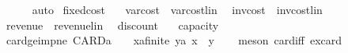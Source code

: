 \begin{isabellebody}
\ \ \ \ \isamarkupfalse%
\ auto\isanewline
{}\isamarkupfalse%
%
\endisatagproof
{\isafoldproof}%
%
\isadelimproof
\isanewline
%
\endisadelimproof
\isanewline
{}\isamarkupfalse%
\ {\isachardoublequoteopen}fixed{\isacharunderscore}{\kern0pt}cost\ {\isasymequiv}\ {}{\isachardoublequoteclose}\isanewline
{}\isamarkupfalse%
\ {\isachardoublequoteopen}var{\isacharunderscore}{\kern0pt}cost\ {\isasymequiv}\ var{\isacharunderscore}{\kern0pt}cost{\isacharunderscore}{\kern0pt}lin\ {}{\isachardoublequoteclose}\isanewline
{}\isamarkupfalse%
\ {\isachardoublequoteopen}inv{\isacharunderscore}{\kern0pt}cost\ {\isasymequiv}\ inv{\isacharunderscore}{\kern0pt}cost{\isacharunderscore}{\kern0pt}lin\ {}{\isachardoublequoteclose}\isanewline
{}\isamarkupfalse%
\ {\isachardoublequoteopen}revenue\ {\isasymequiv}\ revenue{\isacharunderscore}{\kern0pt}lin\ {}{\isachardoublequoteclose}\isanewline
{}\isamarkupfalse%
\ {\isachardoublequoteopen}discount\ {\isasymequiv}\ {}{\isachardot}{\kern0pt}{}{}{\isachardoublequoteclose}\isanewline
{}\isamarkupfalse%
\ capacity\ {\isacharequal}{\kern0pt}\ {\isachardoublequoteopen}{}{}{\isachardoublequoteclose}\isanewline
\isanewline
{}\isamarkupfalse%
\ card{\isacharunderscore}{\kern0pt}ge{\isacharunderscore}{\kern0pt}{}{\isacharunderscore}{\kern0pt}imp{\isacharunderscore}{\kern0pt}ne{\isacharcolon}{\kern0pt}\ {\isachardoublequoteopen}CARD{\isacharparenleft}{\kern0pt}{\isacharprime}{\kern0pt}a{\isacharparenright}{\kern0pt}\ {\isasymge}\ {}\ {\isasymLongrightarrow}\ {\isasymexists}{\isacharparenleft}{\kern0pt}x{\isacharcolon}{\kern0pt}{\isacharcolon}{\kern0pt}{\isacharprime}{\kern0pt}a{\isacharcolon}{\kern0pt}{\isacharcolon}{\kern0pt}finite{\isacharparenright}{\kern0pt}\ y{\isacharcolon}{\kern0pt}{\isacharcolon}{\kern0pt}{\isacharprime}{\kern0pt}a{\isachardot}{\kern0pt}\ x\ {\isasymnoteq}\ y{\isachardoublequoteclose}\isanewline
%
\isadelimproof
\ \ %
\endisadelimproof
%
\isatagproof
{}\isamarkupfalse%
\ {\isacharparenleft}{\kern0pt}meson\ card{\isacharunderscore}{\kern0pt}{}{\isacharunderscore}{\kern0pt}iff{\isacharprime}{\kern0pt}\ ex{\isacharunderscore}{\kern0pt}card{\isacharparenright}{\kern0pt}%
\endisatagproof
{\isafoldproof}%
%
\isadelimproof
\ \ \isanewline
%
\endisadelimproof
\isanewline

\end{isabellebody}
